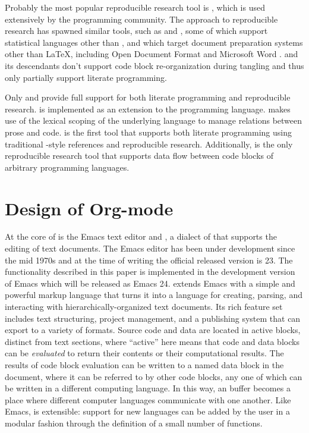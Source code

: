 \documentclass[article,shortnames]{jss}
\begin{document}
Probably the most popular reproducible research tool is , which
is used extensively by the  programming community.  The 
approach to reproducible research has spawned similar tools, such as
 and  , some of which support statistical languages other than ,
and which target document preparation systems other than \LaTeX{},
including Open Document Format and Microsoft Word
\citep{Lenth:2007:SLP,baier07:_excel,kuhn10:_odfweav_packag,lenth09:_statw_users_manual}.
 and its descendants don't support code block re-organization
during tangling and thus only partially support literate programming.

Only  and  provide full support for both literate
programming and reproducible research.   is implemented as an
extension to the  programming language.   makes use of the
lexical scoping of the underlying language to manage relations between
prose and code.   is the first tool that supports both literate
programming using traditional -style references and reproducible
research.  Additionally,  is the only reproducible research
tool that supports data flow between code blocks of arbitrary
programming languages.
\section{Design of Org-mode}
\label{sec-3}
\label{design}

At the core of  is the Emacs text editor \citep{emacs} and
 \citep{lewis10:_gnu_emacs_lisp_refer_manual}, a dialect of
 that supports the editing of text documents.  The Emacs editor
has been under development since the mid 1970s and at the time of
writing the official released version is 23.  The functionality
described in this paper is implemented in the development version of
Emacs which will be released as Emacs 24.
 extends Emacs with a simple and powerful markup
language that turns it into a language for creating, parsing, and
interacting with hierarchically-organized text documents.  Its rich
feature set includes text structuring, project management, and a
publishing system that can export to a variety of formats.  Source
code and data are located in active blocks, distinct from text
sections, where ``active'' here means that code and data blocks can be
\emph{evaluated} to return their contents or their computational results.
The results of code block evaluation can be written to a named data
block in the document, where it can be referred to by other code
blocks, any one of which can be written in a different computing
language.  In this way, an  buffer becomes a place where
different computer languages communicate with one another.  Like
Emacs,  is extensible: support for new languages can be added
by the user in a modular fashion through the definition of a small
number of  functions.
\end{document}
